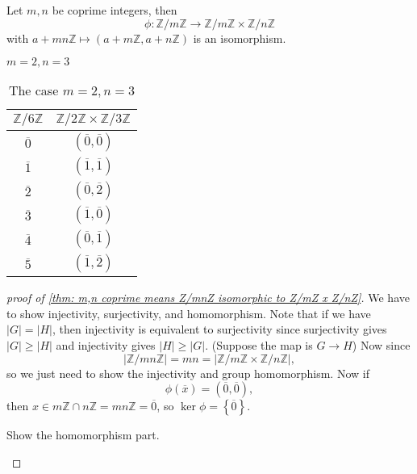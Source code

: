 \begin{theorem} \label{thm: m,n coprime means Z/mnZ isomorphic to Z/mZ x Z/nZ}
    Let \(m, n\) be coprime integers, then 
    \[
        \phi : \mathbb{Z} / m \mathbb{Z} \to \mathbb{Z} / m \mathbb{Z} \times \mathbb{Z} / n \mathbb{Z} 
    \] with \(a + mn \mathbb{Z} \mapsto (a + m \mathbb{Z} , a + n\mathbb{Z} )\) is an isomorphism. 
\end{theorem}

\begin{eg}
    \(m = 2, n = 3\) 
\end{eg}
\begin{table}[H]
    \centering
    \begin{tabular}{c|c}
        \toprule
            \(\mathbb{Z} / 6 \mathbb{Z} \)  & \(\mathbb{Z} / 2 \mathbb{Z}  \times \mathbb{Z} / 3 \mathbb{Z} \)   \\
        \midrule
            \(\overline{0} \)  & \(\left( \overline{0}, \overline{0}   \right) \)   \\
            \(\overline{1} \) & \(\left( \overline{1}, \overline{1}   \right) \)  \\
            \(\overline{2} \) & \(\left( \overline{0}, \overline{2}   \right) \)  \\
            \(\overline{3} \)  & \(\left( \overline{1}, \overline{0}   \right) \)  \\
            \(\overline{4} \)  &\(\left( \overline{0}, \overline{1}   \right) \)  \\
            \(\overline{5} \)  & \(\left( \overline{1}, \overline{2}   \right) \)  \\
        \bottomrule
    \end{tabular}
    \caption{The case \(m=2, n=3\)}
    \label{tab:Z6Z isomorphic to Z2Z Z3Z}
\end{table}

\begin{proof}[proof of \autoref{thm: m,n coprime means Z/mnZ isomorphic to Z/mZ x Z/nZ}]
    We have to show injectivity, surjectivity, and homomorphism. Note that if we have \(\vert G \vert = \vert H \vert  \), then injectivity is equivalent to surjectivity since surjectivity gives \(\vert G \vert \ge \vert H \vert \) and injectivity gives \(\vert H \vert \ge \vert G \vert \). (Suppose the map is \(G \to H\)) Now since 
    \[
        \left\vert \mathbb{Z} / mn \mathbb{Z}  \right\vert = mn = \left\vert \mathbb{Z} / m \mathbb{Z} \times \mathbb{Z} / n \mathbb{Z}  \right\vert,  
    \] so we just need to show the injectivity and group homomorphism. Now if 
    \[
        \phi \left( \overline{x}  \right) = (\overline{0}, \overline{0}),  
    \] then \(x \in m\mathbb{Z} \cap n \mathbb{Z} = mn \mathbb{Z} = \overline{0} \), so \(\ker \phi = \left\{ \overline{0}  \right\} \). 
    
    \begin{exercise}
        Show the homomorphism part.
    \end{exercise}
\end{proof}

